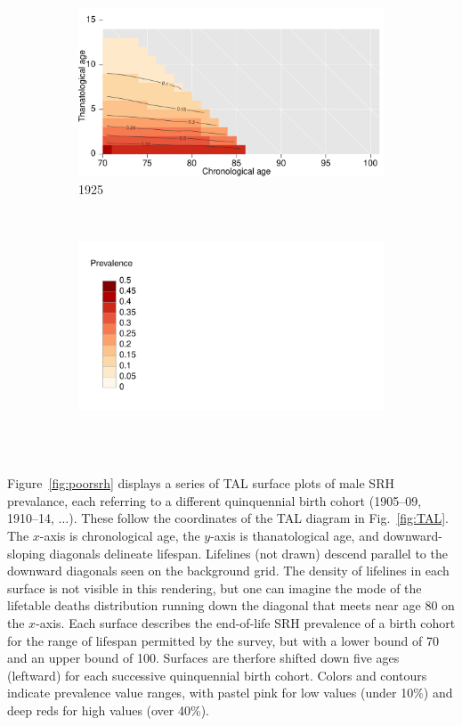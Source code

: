 \documentclass[12pt,oneside,a4paper,doublespacing]{article} %
\theoremstyle{definition}
\begin{document}
\begin{figure}[h!]
\begin{subfigure}{.46\textwidth}
\centering
\caption{1925}
\vspace{-1em}
\label{fig:srh1925}
\includegraphics[scale=0.32]{Figures/TALapplication/srhpoor1925.pdf}
\end{subfigure}
~
\begin{subfigure}{.46\textwidth}
\centering
\caption*{~}
\vspace{-1em}
\label{fig:srhlegend}
\includegraphics[scale=0.32]{Figures/TALapplication/Legend.pdf}
\end{subfigure}
\end{figure} 

Figure~\ref{fig:poorsrh} displays a series of TAL surface plots of male SRH
prevalance, each referring to a different quinquennial birth cohort (1905--09, 1910--14, $\dots$). These follow the coordinates of the TAL diagram in Fig.~\ref{fig:TAL}.
The $x$-axis is chronological age, the $y$-axis is thanatological age, and
downward-sloping diagonals delineate lifespan. Lifelines (not drawn) descend
parallel to the downward diagonals seen on the background grid. The density of
lifelines in each surface is not visible in this rendering, but one can imagine
the mode of the lifetable deaths distribution running down the diagonal that
meets near age 80 on the $x$-axis. Each surface describes the end-of-life SRH
prevalence of a birth cohort for the range of lifespan permitted by the survey,
but with a lower bound of 70 and an upper bound of 100. Surfaces are therfore
shifted down five ages (leftward) for each successive quinquennial birth cohort.
Colors and contours indicate prevalence value ranges, with pastel pink for low
values (under 10\%) and deep reds for high values (over 40\%).
\end{document}
